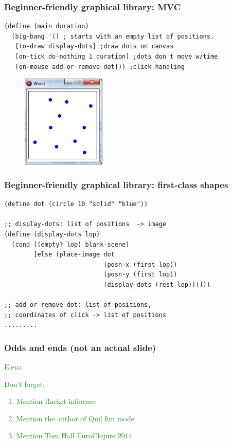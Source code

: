 \documentclass{beamer}
\newcommand{\comment}[1]{{\bf \tt  {#1}}}
\newcommand{\emcomment}[1]{\textcolor{ForestGreen}{\comment{Elena: {#1}}}}
\begin{document}
\begin{frame}[fragile]
\frametitle{Beginner-friendly graphical library: MVC}
\begin{verbatim}
(define (main duration)
  (big-bang '() ; starts with an empty list of positions.
   [to-draw display-dots] ;draw dots on canvas
   [on-tick do-nothing 1 duration] ;dots don't move w/time
   [on-mouse add-or-remove-dot])) ;click handling
\end{verbatim}
\begin{figure}[h]
\includegraphics[width=4cm]{PresentationImages/dots.jpg}
\end{figure}
\end{frame}

\begin{frame}[fragile]
\frametitle{Beginner-friendly graphical library: first-class shapes}
\begin{verbatim}
(define dot (circle 10 "solid" "blue"))

;; display-dots: list of positions  -> image
(define (display-dots lop)     
  (cond [(empty? lop) blank-scene]
        [else (place-image dot
                           (posn-x (first lop))
                           (posn-y (first lop))
                           (display-dots (rest lop)))]))

;; add-or-remove-dot: list of positions, 
;; coordinates of click -> list of positions
.........
\end{verbatim}

\end{frame}

\begin{frame}
\frametitle{Odds and ends (not an actual slide)}
\emcomment{Don't forget:
\begin{enumerate}
\item Mention Racket influence  
\item Mention the author of Quil fun mode
\item Mention Tom Hall EuroClojure 2014
\end{enumerate}
}
\end{frame}
\end{document}
